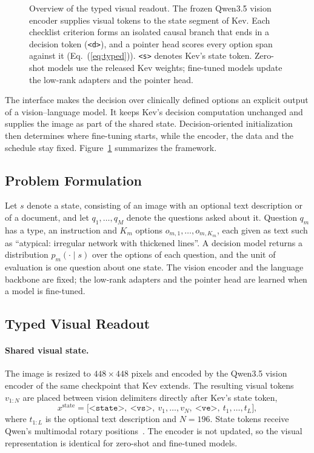\documentclass{article}
\begin{document}
\begin{figure}[t]
{}
\caption{Overview of the typed visual readout. The frozen Qwen3.5 vision encoder supplies visual tokens to the state segment of Kev. Each checklist criterion forms an isolated causal branch that ends in a decision token (\texttt{<d>}), and a pointer head scores every option span against it (Eq.~(\ref{eq:typed})). \texttt{<s>} denotes Kev's state token. Zero-shot models use the released Kev weights; fine-tuned models update the low-rank adapters and the pointer head.}
\label{fig:method}
\end{figure}

The interface makes the decision over clinically defined options an explicit output of a vision--language model. It keeps Kev's decision computation unchanged and supplies the image as part of the shared state. Decision-oriented initialization then determines where fine-tuning starts, while the encoder, the data and the schedule stay fixed. Figure~\ref{fig:method} summarizes the framework.

\subsection{Problem Formulation}
Let $s$ denote a state, consisting of an image with an optional text description or of a document, and let $q_1,\dots,q_M$ denote the questions asked about it. Question $q_m$ has a type, an instruction and $K_m$ options $o_{m,1},\dots,o_{m,K_m}$, each given as text such as ``atypical: irregular network with thickened lines''. A decision model returns a distribution $p_m(\cdot\mid s)$ over the options of each question, and the unit of evaluation is one question about one state. The vision encoder and the language backbone are fixed; the low-rank adapters and the pointer head are learned when a model is fine-tuned.

\subsection{Typed Visual Readout}
\paragraph{Shared visual state.} The image is resized to $448\times448$ pixels and encoded by the Qwen3.5 vision encoder of the same checkpoint that Kev extends. The resulting visual tokens $v_{1:N}$ are placed between vision delimiters directly after Kev's state token,
\begin{equation}
  x^{\mathrm{state}} = \big[\texttt{<state>},\ \texttt{<vs>},\ v_1,\dots,v_N,\ \texttt{<ve>},\ t_1,\dots,t_L\big],
  \label{eq:state}
\end{equation}
where $t_{1:L}$ is the optional text description and $N=196$. State tokens receive Qwen's multimodal rotary positions~\citep{wang2024qwen2vl}. The encoder is not updated, so the visual representation is identical for zero-shot and fine-tuned models.
\end{document}
